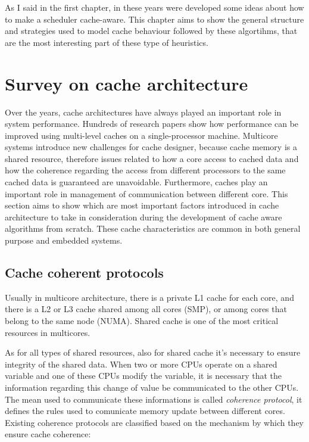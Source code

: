 As I said in the first chapter, in these years were developed some ideas about how to make a scheduler cache-aware.
This chapter aims to show the general structure and strategies used to model cache behaviour followed by these algortihms, that are the most interesting 
part of these type of heuristics.

\section{Survey on cache architecture}
\label{sec:s1}

Over the years, cache architectures have always played an important role in system performance. Hundreds of research papers show how performance
can be improved using multi-level caches on a single-processor machine. Multicore systems introduce new challenges for cache designer, because cache memory 
is a shared resource, therefore issues related to how a core access to cached data and how the coherence regarding the access from different processors 
to the same cached data is guaranteed are unavoidable. Furthermore, caches play an important role in management of communication between different core.
This section aims to show which are most important factors introduced in cache architecture to take in consideration during the development of cache aware
algorithms from scratch. These cache characteristics are common in both general purpose and embedded systems.

\subsection{Cache coherent protocols}

Usually in multicore architecture, there is a private L1 cache for each core, and there is a L2 or L3 cache shared among all cores (SMP), or among cores 
that belong to the same node (NUMA). Shared cache is one of the most critical resources in multicores.

As for all types of shared resources, also for shared cache it's necessary to ensure integrity of the shared data.
When two or more CPUs operate on a shared variable and one of these CPUs modify the variable, it is necessary that the information regarding
this change of value be communicated to the other CPUs. The mean used to communicate these informations is called \textit{coherence protocol}, it defines 
the rules used to comunicate memory update between different cores. Existing coherence protocols are classified based on the mechanism by which they ensure 
cache coherence: 

